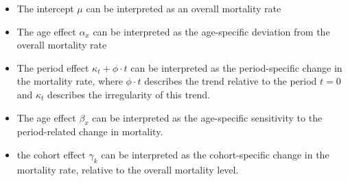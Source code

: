 \begin{itemize}
    \item The intercept $\mu$ can be interpreted as an overall mortality rate
    \item The age effect $\alpha_x$ can be interpreted as the age-specific deviation from the overall mortality rate
    \item The period effect $\kappa_t + \phi \cdot t$ can be interpreted as the period-specific change in the mortality rate, where $\phi \cdot t$ describes the trend relative to the period $t = 0$ and $\kappa_t$ describes the irregularity of this trend. 
    \item The age effect $\beta_x$ can be interpreted as the age-specific sensitivity to the period-related change in mortality. 
    \item the cohort effect $\gamma_k$ can be interpreted as the cohort-specific change in the mortality rate, relative to the overall mortality level. 
\end{itemize}

